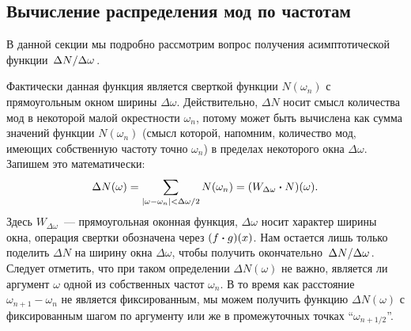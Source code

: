 \documentclass[12pt,a4paper]{article}
\begin{document}

    \begin{subappendices}


    \subsection{Вычисление распределения мод по частотам\label{sec:getting_plank_formula}}

        В данной секции мы подробно рассмотрим вопрос получения асимптотической функции $\flatfrac{\Delta N}{\Delta \omega}$.

        Фактически данная функция является сверткой функции $N(\omega_n)$ с прямоугольным окном ширины $\Delta \omega$. Действительно, $\Delta N$ носит смысл количества мод в некоторой малой окрестности $\omega_n$, потому может быть вычислена как сумма значений функции $N(\omega_n)$ (смысл которой, напомним, количество мод, имеющих собственную частоту точно $\omega_n$) в пределах некоторого окна $\Delta \omega$. Запишем это математически:
        \begin{equation}
            \Delta N(\omega) = \sum\limits_{
                \qty|\omega - \omega_n| < \Delta\omega/2
            } N(\omega_n) = \qty(W_{\Delta\omega} \vdot N)(\omega) .
        \end{equation}
        Здесь $W_{\Delta\omega}$~--- прямоугольная оконная функция, $\Delta\omega$ носит характер ширины окна, операция свертки обозначена через $(f \vdot g)(x)$. Нам остается лишь только поделить $\Delta N$ на ширину окна $\Delta\omega$, чтобы получить окончательно $\flatfrac{\Delta N}{\Delta \omega}$. Следует отметить, что при таком определении $\Delta N(\omega)$ не важно, является ли аргумент $\omega$ одной из собственных частот $\omega_n$. В то время как расстояние $\omega_{n+1} - \omega_n$ не является фиксированным, мы можем получить функцию $\Delta N(\omega)$ с фиксированным шагом по аргументу или же в промежуточных точках \enquote{$\omega_{n+1/2}$}.


\end{subappendices}
\end{document}
